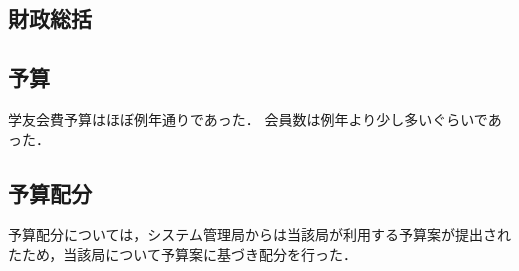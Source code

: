 \subsection*{財政総括}


\subsection*{予算}
学友会費予算はほぼ例年通りであった．
会員数は例年より少し多いぐらいであった．

\subsection*{予算配分}
予算配分については，システム管理局からは当該局が利用する予算案が提出されたため，当該局について予算案に基づき配分を行った．
